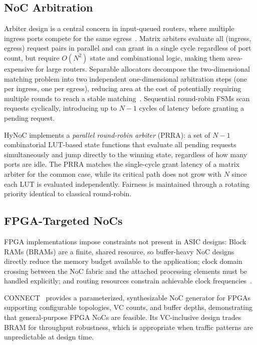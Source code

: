 \subsection{NoC Arbitration}

Arbiter design is a central concern in input-queued routers, where multiple
ingress ports compete for the same egress~\cite{dally2004}.
Matrix arbiters evaluate all (ingress, egress) request pairs in parallel and can
grant in a single cycle regardless of port count, but require $O(N^2)$ state and
combinational logic, making them area-expensive for large routers.
Separable allocators decompose the two-dimensional matching problem into two
independent one-dimensional arbitration steps (one per ingress, one per egress),
reducing area at the cost of potentially requiring multiple rounds to reach a
stable matching~\cite{dally2004}.
Sequential round-robin FSMs scan requests cyclically, introducing up to $N-1$
cycles of latency before granting a pending request.

HyNoC implements a \emph{parallel round-robin arbiter} (PRRA): a set of $N-1$
combinatorial LUT-based state functions that evaluate all pending requests
simultaneously and jump directly to the winning state, regardless of how many
ports are idle. The PRRA matches the single-cycle grant latency of a matrix
arbiter for the common case, while its critical path does not grow with $N$ since
each LUT is evaluated independently. Fairness is maintained through a rotating
priority identical to classical round-robin.

\subsection{FPGA-Targeted NoCs}

FPGA implementations impose constraints not present in ASIC designs: Block RAMs
(BRAMs) are a finite, shared resource, so buffer-heavy NoC designs directly reduce
the memory budget available to the application; clock domain crossing between the
NoC fabric and the attached processing elements must be handled explicitly; and
routing resources constrain achievable clock frequencies~\cite{papamichael2012}.

CONNECT~\cite{papamichael2012} provides a parameterized, synthesizable NoC
generator for FPGAs supporting configurable topologies, VC counts, and buffer
depths, demonstrating that general-purpose FPGA NoCs are feasible. Its
VC-inclusive design trades BRAM for throughput robustness, which is appropriate
when traffic patterns are unpredictable at design time.

